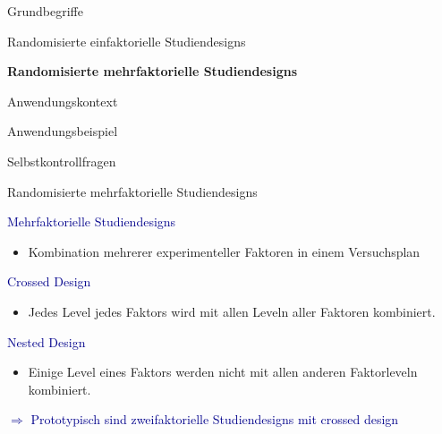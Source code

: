 \documentclass[
  8pt,
  ignorenonframetext,
]{beamer}
\providecommand{\tightlist}{%
  \setlength{\itemsep}{0pt}\setlength{\parskip}{0pt}}
\begin{document}
\begin{frame}[plain]{}
\protect\hypertarget{section-5}{}
\vfill
\large
{}

Grundbegriffe

Randomisierte einfaktorielle Studiendesigns

\textbf{Randomisierte mehrfaktorielle Studiendesigns}

Anwendungskontext

Anwendungsbeispiel

Selbstkontrollfragen \vfill
\end{frame}

\begin{frame}{Randomisierte mehrfaktorielle Studiendesigns}
\protect\hypertarget{randomisierte-mehrfaktorielle-studiendesigns}{}

\textcolor{darkblue}{Mehrfaktorielle Studiendesigns}

\begin{itemize}
\tightlist
\item
  Kombination mehrerer experimenteller Faktoren in einem Versuchsplan
\end{itemize}

\textcolor{darkblue}{Crossed Design}

\begin{itemize}
\tightlist
\item
  Jedes Level jedes Faktors wird mit allen Leveln aller Faktoren
  kombiniert.
\end{itemize}

\textcolor{darkblue}{Nested Design}

\begin{itemize}
\tightlist
\item
  Einige Level eines Faktors werden nicht mit allen anderen Faktorleveln
  kombiniert.
\end{itemize}

\center

\textcolor{darkblue}{$\Rightarrow$ Prototypisch sind zweifaktorielle Studiendesigns mit crossed design}
\end{frame}
\end{document}
